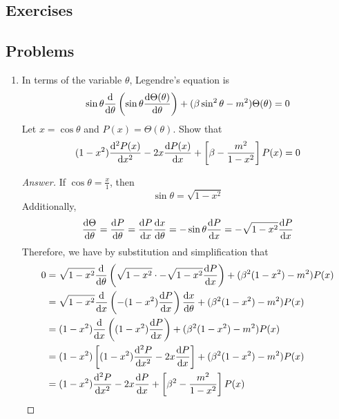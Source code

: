 \documentclass[../notes.tex]{subfiles}
\begin{document}
\subsection*{Exercises}
\subsection*{Problems}
\begin{enumerate}[label={\textbf{6-\arabic*.}},ref={6-\arabic*}]
    \item \label{prb:6-2}In terms of the variable $\theta$, Legendre's equation is
    \begin{equation*}
        \sin\theta\dv{\theta}\left( \sin\theta\dv{\Theta(\theta)}{\theta} \right)+(\beta\sin^2\theta-m^2)\Theta(\theta) = 0
    \end{equation*}
    Let $x=\cos\theta$ and $P(x)=\Theta(\theta)$. Show that
    \begin{equation*}
        (1-x^2)\dv[2]{P(x)}{x}-2x\dv{P(x)}{x}+\left[ \beta-\frac{m^2}{1-x^2} \right]P(x) = 0
    \end{equation*}
    \begin{proof}[Answer]
        If $\cos\theta=\frac{x}{1}$, then
        \begin{equation*}
            \sin\theta = \sqrt{1-x^2}
        \end{equation*}
        Additionally,
        \begin{equation*}
            \dv{\Theta}{\theta} = \dv{P}{\theta}
            = \dv{P}{x}\dv{x}{\theta}
            = -\sin\theta\dv{P}{x}
            = -\sqrt{1-x^2}\dv{P}{x}
        \end{equation*}
        Therefore, we have by substitution and simplification that
        \begin{align*}
            0 &= \sqrt{1-x^2}\dv{\theta}\left( \sqrt{1-x^2}\cdot -\sqrt{1-x^2}\dv{P}{x} \right)+(\beta^2(1-x^2)-m^2)P(x)\\
            &= \sqrt{1-x^2}\dv{x}\left( -(1-x^2)\dv{P}{x} \right)\dv{x}{\theta}+(\beta^2(1-x^2)-m^2)P(x)\\
            &= (1-x^2)\dv{x}\left( (1-x^2)\dv{P}{x} \right)+(\beta^2(1-x^2)-m^2)P(x)\\
            &= (1-x^2)\left[ (1-x^2)\dv[2]{P}{x}-2x\dv{P}{x} \right]+(\beta^2(1-x^2)-m^2)P(x)\\
            &= (1-x^2)\dv[2]{P}{x}-2x\dv{P}{x}+\left[ \beta^2-\frac{m^2}{1-x^2} \right]P(x)
        \end{align*}
    \end{proof}
\end{enumerate}
\end{document}
